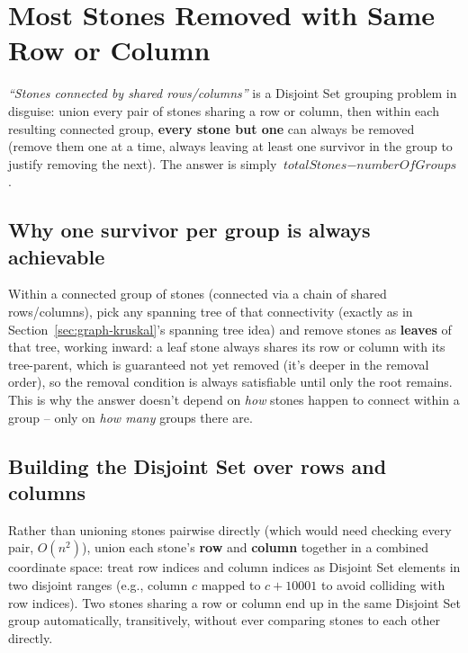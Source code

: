 \section{Most Stones Removed with Same Row or Column}
\label{sec:graph-most-stones-removed}


\begin{patternbox}
\emph{``Stones connected by shared rows/columns''} is a Disjoint Set
grouping problem in disguise: union every pair of stones sharing a row
or column, then within each resulting connected group, \textbf{every
stone but one} can always be removed (remove them one at a time,
always leaving at least one survivor in the group to justify removing
the next). The answer is simply
$\textit{totalStones} - \textit{numberOfGroups}$.
\end{patternbox}

\subsection*{Why one survivor per group is always achievable}

Within a connected group of stones (connected via a chain of shared
rows/columns), pick any spanning tree of that connectivity (exactly
as in Section~\ref{sec:graph-kruskal}'s spanning tree idea) and remove
stones as \textbf{leaves} of that tree, working inward: a leaf stone
always shares its row or column with its tree-parent, which is
guaranteed not yet removed (it's deeper in the removal order), so the
removal condition is always satisfiable until only the root remains.
This is why the answer doesn't depend on \emph{how} stones happen to
connect within a group -- only on \emph{how many} groups there are.

\subsection*{Building the Disjoint Set over rows and columns}

Rather than unioning stones pairwise directly (which would need
checking every pair, $O(n^2)$), union each stone's \textbf{row} and
\textbf{column} together in a combined coordinate space: treat row
indices and column indices as Disjoint Set elements in two disjoint
ranges (e.g., column $c$ mapped to $c + 10001$ to avoid colliding with
row indices). Two stones sharing a row or column end up in the same
Disjoint Set group automatically, transitively, without ever comparing
stones to each other directly.

